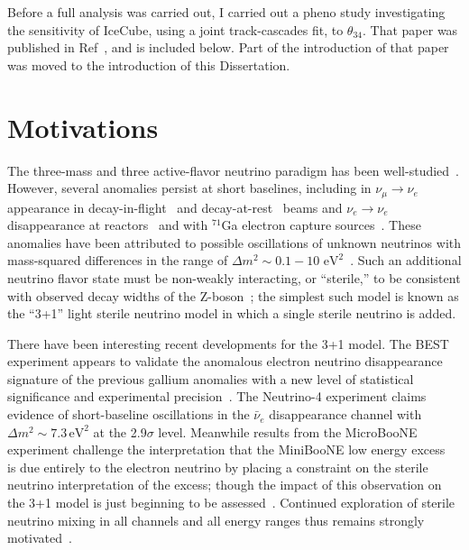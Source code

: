 \documentclass[main.tex]{subfiles}
\begin{document}
Before a full analysis was carried out, I carried out a pheno study investigating the sensitivity of IceCube, using a joint track-cascades fit, to $\theta_{34}$. 
That paper was published in Ref~\cite{PhysRevD.105.052001}, and is included below. 
Part of the introduction of that paper was moved to the introduction of this Dissertation. 

\section{\label{sec:one}Motivations}

\iffalse
The three-mass and three active-flavor neutrino paradigm has been well-studied~\cite{PhysRevD.98.030001,Esteban_2019,de_Salas_2018,Capozzi_2016,zboson2006, berns2021recent}.
However, several anomalies persist at short baselines, including in $\nu_\mu\rightarrow\nu_e $ appearance in decay-in-flight~\cite{aguilar2018significant} and decay-at-rest~\cite{Athanassopoulos_1998} beams  and $\nu_e\rightarrow\nu_e$ disappearance at reactors~\cite{mention2011reactor,serebrov2019first}  and with $^{71}$Ga electron capture sources~\cite{PhysRevC.73.045805,giunti2011statistical}.  These anomalies have been attributed to possible oscillations of unknown neutrinos with mass-squared differences in the range of $\Delta m^{2}\sim 0.1-10\text{ eV}^{2}$~\cite{abazajian2012light}.   Such an additional neutrino flavor state must be non-weakly interacting, or ``sterile,'' to be consistent with observed decay widths of the Z-boson~\cite{zboson2006}; the simplest such model is known as the ``3+1'' light sterile neutrino model in which a single sterile neutrino is added. 

There have been interesting recent developments for the 3+1 model.  The BEST experiment appears to validate the anomalous electron neutrino disappearance signature of the previous gallium anomalies with a new level of statistical significance and experimental precision~\cite{barinov2021results}. The Neutrino-4 experiment claims evidence of short-baseline oscillations in the $\bar{\nu}_e$ disappearance channel with $\Delta m^2\sim 7.3\,\mathrm{eV}^2$ at the 2.9$\sigma$ level. Meanwhile results from the MicroBooNE~\cite{microboonecollaboration2021search,microboonecollaboration2021search1,microboonecollaboration2021searchmulti} experiment challenge the interpretation that the MiniBooNE low energy excess~\cite{miniboone2018} is due entirely to the electron neutrino by placing a constraint on the sterile neutrino interpretation of the excess; though the impact of this observation on the 3+1 model is just beginning to be assessed~\cite{arguelles2021microboone,denton2021sterile}.  Continued exploration of sterile neutrino mixing in all channels and all energy ranges thus remains strongly motivated~\cite{sbnfermilab}.
\end{document}
